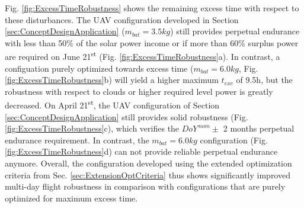 Fig. \ref{fig:ExcessTimeRobustness} shows the remaining excess time with respect to these disturbances. The UAV configuration developed in Section \ref{sec:ConceptDesignApplication} ($m_{bat}=3.5kg$) still provides perpetual endurance with less than 50\% of the solar power income or if more than 60\% surplus power are required on June 21\textsuperscript{st} (Fig. \ref{fig:ExcessTimeRobustness}a). In contrast, a configuation purely optimized towards excess time ($m_{bat}=6.0kg$, Fig. \ref{fig:ExcessTimeRobustness}b) will yield a higher maximum $t_{exc}$ of 9.5h, but the robustness with respect to clouds or higher required level power is greatly decreased. On April  21\textsuperscript{st}, the UAV configuration of Section \ref{sec:ConceptDesignApplication} still provides solid robustness (Fig. \ref{fig:ExcessTimeRobustness}c), which verifies the $DoY^{\,nom}\pm$ 2 months perpetual endurance requirement. In contrast, the $m_{bat}=6.0kg$ configuration (Fig. \ref{fig:ExcessTimeRobustness}d) can not provide reliable perpetual endurance anymore. Overall, the configuration developed using the extended optimization criteria from Sec. \ref{sec:ExtensionOptCriteria} thus shows significantly improved multi-day flight robustness in comparison with configurations that are purely optimized for maximum excess time.